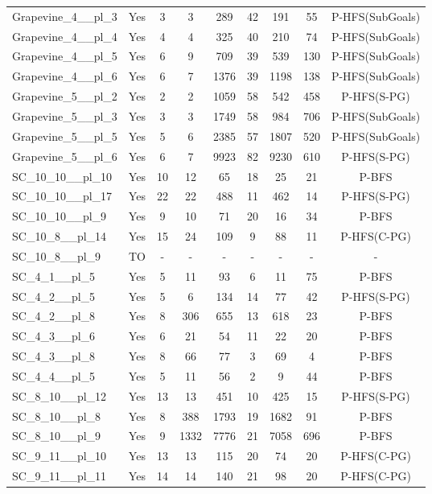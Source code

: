 \documentclass{article}
\begin{document}
\begin{tabular}{lcccccccc}
Grapevine\_4\_\_pl\_3 & Yes & 3 & 3 & 289 & 42 & 191 & 55 & P-HFS(SubGoals) \\
Grapevine\_4\_\_pl\_4 & Yes & 4 & 4 & 325 & 40 & 210 & 74 & P-HFS(SubGoals) \\
Grapevine\_4\_\_pl\_5 & Yes & 6 & 9 & 709 & 39 & 539 & 130 & P-HFS(SubGoals) \\
Grapevine\_4\_\_pl\_6 & Yes & 6 & 7 & 1376 & 39 & 1198 & 138 & P-HFS(SubGoals) \\
Grapevine\_5\_\_pl\_2 & Yes & 2 & 2 & 1059 & 58 & 542 & 458 & P-HFS(S-PG) \\
Grapevine\_5\_\_pl\_3 & Yes & 3 & 3 & 1749 & 58 & 984 & 706 & P-HFS(SubGoals) \\
Grapevine\_5\_\_pl\_5 & Yes & 5 & 6 & 2385 & 57 & 1807 & 520 & P-HFS(SubGoals) \\
Grapevine\_5\_\_pl\_6 & Yes & 6 & 7 & 9923 & 82 & 9230 & 610 & P-HFS(S-PG) \\
SC\_10\_10\_\_pl\_10 & Yes & 10 & 12 & 65 & 18 & 25 & 21 & P-BFS \\
SC\_10\_10\_\_pl\_17 & Yes & 22 & 22 & 488 & 11 & 462 & 14 & P-HFS(S-PG) \\
SC\_10\_10\_\_pl\_9 & Yes & 9 & 10 & 71 & 20 & 16 & 34 & P-BFS \\
SC\_10\_8\_\_pl\_14 & Yes & 15 & 24 & 109 & 9 & 88 & 11 & P-HFS(C-PG) \\
SC\_10\_8\_\_pl\_9 & TO & - & - & - & - & - & - & - \\
SC\_4\_1\_\_pl\_5 & Yes & 5 & 11 & 93 & 6 & 11 & 75 & P-BFS \\
SC\_4\_2\_\_pl\_5 & Yes & 5 & 6 & 134 & 14 & 77 & 42 & P-HFS(S-PG) \\
SC\_4\_2\_\_pl\_8 & Yes & 8 & 306 & 655 & 13 & 618 & 23 & P-BFS \\
SC\_4\_3\_\_pl\_6 & Yes & 6 & 21 & 54 & 11 & 22 & 20 & P-BFS \\
SC\_4\_3\_\_pl\_8 & Yes & 8 & 66 & 77 & 3 & 69 & 4 & P-BFS \\
SC\_4\_4\_\_pl\_5 & Yes & 5 & 11 & 56 & 2 & 9 & 44 & P-BFS \\
SC\_8\_10\_\_pl\_12 & Yes & 13 & 13 & 451 & 10 & 425 & 15 & P-HFS(S-PG) \\
SC\_8\_10\_\_pl\_8 & Yes & 8 & 388 & 1793 & 19 & 1682 & 91 & P-BFS \\
SC\_8\_10\_\_pl\_9 & Yes & 9 & 1332 & 7776 & 21 & 7058 & 696 & P-BFS \\
SC\_9\_11\_\_pl\_10 & Yes & 13 & 13 & 115 & 20 & 74 & 20 & P-HFS(C-PG) \\
SC\_9\_11\_\_pl\_11 & Yes & 14 & 14 & 140 & 21 & 98 & 20 & P-HFS(C-PG) \\

\end{tabular}
\end{document}
